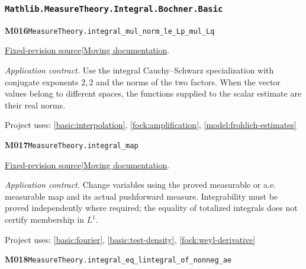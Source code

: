 \documentclass[11pt,a4paper]{article}
\theoremstyle{definition}
\theoremstyle{remark}
\begin{document}
\subsubsection*{\nolinkurl{Mathlib.MeasureTheory.Integral.Bochner.Basic}}
\noindent\textbf{M016}\label{base:M016}\quad\nolinkurl{MeasureTheory.integral_mul_norm_le_Lp_mul_Lq}

\href{https://github.com/leanprover-community/mathlib4/blob/9bac2d0692944a775113f7c130fd5e5b4608a854/Mathlib/MeasureTheory/Integral/Bochner/Basic.lean}{Fixed-revision source}\quad|\quad\href{https://leanprover-community.github.io/mathlib4_docs/Mathlib/MeasureTheory/Integral/Bochner/Basic.html#MeasureTheory.integral_mul_norm_le_Lp_mul_Lq}{Moving documentation}.\par
\noindent\textit{Application contract.} Use the integral Cauchy--Schwarz specialization with conjugate exponents $2,2$ and the norms of the two factors. When the vector values belong to different spaces, the functions supplied to the scalar estimate are their real norms.\par
{\small Project uses: \ref{basic:interpolation}, \ref{fock:amplification}, \ref{model:frohlich-estimates}}\par\medskip

\noindent\textbf{M017}\label{base:M017}\quad\nolinkurl{MeasureTheory.integral_map}

\href{https://github.com/leanprover-community/mathlib4/blob/9bac2d0692944a775113f7c130fd5e5b4608a854/Mathlib/MeasureTheory/Integral/Bochner/Basic.lean}{Fixed-revision source}\quad|\quad\href{https://leanprover-community.github.io/mathlib4_docs/Mathlib/MeasureTheory/Integral/Bochner/Basic.html#MeasureTheory.integral_map}{Moving documentation}.\par
\noindent\textit{Application contract.} Change variables using the proved measurable or a.e. measurable map and its actual pushforward measure. Integrability must be proved independently where required; the equality of totalized integrals does not certify membership in $L^1$.\par
{\small Project uses: \ref{basic:fourier}, \ref{basic:test-density}, \ref{fock:weyl-derivative}}\par\medskip

\noindent\textbf{M018}\label{base:M018}\quad\nolinkurl{MeasureTheory.integral_eq_lintegral_of_nonneg_ae}
\end{document}
